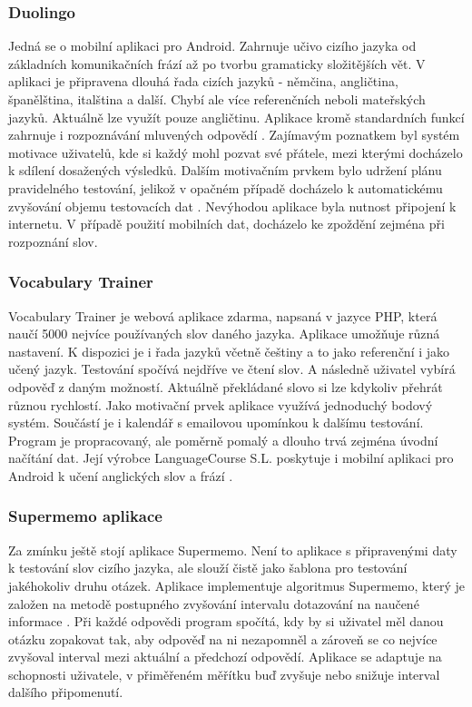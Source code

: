 \documentclass[a4paper,11pt,titlepage,fleqn]{article}
\begin{document}
        \subsubsection{Duolingo}
            Jedná se o mobilní aplikaci pro Android. Zahrnuje učivo cizího jazyka od základních komunikačních frází až po tvorbu gramaticky složitějších vět. V aplikaci je připravena dlouhá řada cizích jazyků - němčina, angličtina, španělština, italština a další. Chybí ale více referenčních neboli mateřských jazyků. Aktuálně lze využít pouze angličtinu. Aplikace kromě standardních funkcí zahrnuje i rozpoznávání mluvených odpovědí \cite{bib:duolingo}. Zajímavým poznatkem byl systém motivace uživatelů, kde si každý mohl pozvat své přátele, mezi kterými docházelo k sdílení dosažených výsledků. Dalším motivačním prvkem bylo udržení plánu pravidelného testování, jelikož v opačném případě docházelo k automatickému zvyšování objemu testovacích dat \cite{bib:duo-effectivness}. Nevýhodou aplikace byla nutnost připojení k internetu. V případě použití mobilních dat, docházelo ke zpoždění zejména při rozpoznání slov.

        \subsubsection{Vocabulary Trainer}
            Vocabulary Trainer je webová aplikace zdarma, napsaná v jazyce PHP, která naučí 5000 nejvíce používaných slov daného jazyka. Aplikace umožňuje různá nastavení. K dispozici je i řada jazyků včetně češtiny a to jako referenční i jako učený jazyk. Testování spočívá nejdříve ve čtení slov. A následně uživatel vybírá odpověď z daným možností. Aktuálně překládané slovo si lze kdykoliv přehrát různou rychlostí. Jako motivační prvek aplikace využívá jednoduchý bodový systém. Součástí je i kalendář s emailovou upomínkou k dalšímu testování. Program je propracovaný, ale poměrně pomalý a dlouho trvá zejména úvodní načítání dat. Její výrobce LanguageCourse S.L. poskytuje i mobilní aplikaci pro Android k učení anglických slov a frází \cite{bib:vocab-trainer}.

        \subsubsection{Supermemo aplikace}
            \label{supermemo-app}
            Za zmínku ještě stojí aplikace Supermemo. Není to aplikace s připravenými daty k testování slov cizího jazyka, ale slouží čistě jako šablona pro testování jakéhokoliv druhu otázek. Aplikace implementuje algoritmus Supermemo, který je založen na metodě postupného zvyšování intervalu dotazování na naučené informace \cite{bib:supermemo}. Při každé odpovědi program spočítá, kdy by si uživatel měl danou otázku zopakovat tak, aby odpověď na ni nezapomněl a zároveň se co nejvíce zvyšoval interval mezi aktuální a předchozí odpovědí. Aplikace se adaptuje na schopnosti uživatele, v přiměřeném měřítku buď zvyšuje nebo snižuje interval dalšího připomenutí.
\end{document}
